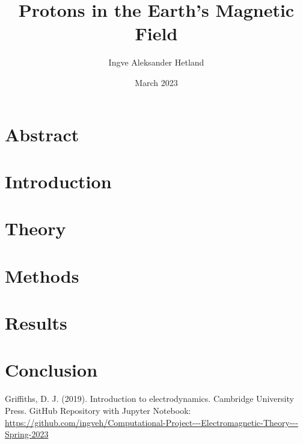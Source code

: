 \documentclass{article}
\title{Protons in the Earth's Magnetic Field}
\author{Ingve Aleksander Hetland}
\date{March 2023}
\begin{document}
\maketitle

\section{Abstract}


\section{Introduction}


\section{Theory}


\section{Methods}


\section{Results}


\section{Conclusion}


\begin{thebibliography}{9}
    Griffiths, D. J. (2019). Introduction to electrodynamics. Cambridge University Press.
    GitHub Repository with Jupyter Notebook: \url{https://github.com/ingveh/Computational-Project---Electromagnetic-Theory---Spring-2023}

\end{thebibliography}
\end{document}
